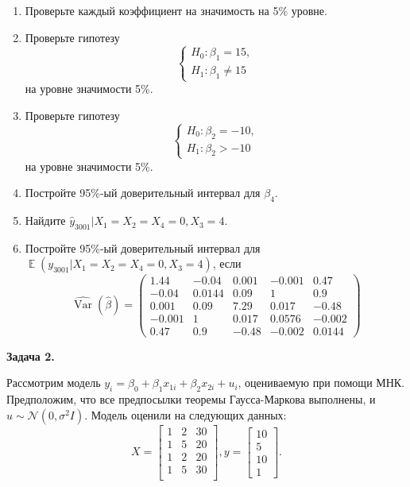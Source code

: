 \documentclass[10pt, a4paper]{extarticle}
\DeclareMathOperator{\Var}{Var}
\DeclareMathOperator{\E}{\mathbb{E}}
\begin{document}
	\begin{enumerate}[label=\alph*)]
		\item Проверьте каждый коэффициент на значимость на 5\% уровне.
		\item Проверьте гипотезу
		\[
		\begin{cases}
			H_0: \beta_1 = 15, \\
			H_1: \beta_1 \ne 15
		\end{cases}
		\]
		на уровне значимости 5\%.
		\item Проверьте гипотезу
		\[
		\begin{cases}
			H_0: \beta_2 = -10, \\
			H_1: \beta_2 > -10
		\end{cases}
		\]
		на уровне значимости 5\%.
		\item Постройте 95\%-ый доверительный интервал для $\beta_4$. 
		\item Найдите $\hat{y}_{3001} | X_1 = X_2 = X_4 = 0, X_3 = 4$. 
		\item Постройте 95\%-ый доверительный интервал для $\E(y_{3001} | X_1 = X_2 = X_4 = 0, X_3 = 4)$, если 
		\[
		\hat{\Var}(\hat{\beta}) = \begin{pmatrix}
			  1.44 & -0.04 & 0.001 & -0.001  & 0.47 \\
			-0.04  & 0.0144 & 0.09 & 1 & 0.9 \\
			0.001  & 0.09 & 7.29 & 0.017 & -0.48 \\
			-0.001 & 1 & 0.017 & 0.0576 & -0.002 \\
			0.47 & 0.9 & -0.48 & -0.002 & 0.0144
		\end{pmatrix}
		\]
	\end{enumerate}
	\vspace{1em}
	\newpage

	{\Large \textbf{Задача 2.}}
	
	Рассмотрим модель $y_i = \beta_0 + \beta_1x_{1i} + \beta_2x_{2i} + u_i$, оцениваемую при помощи МНК. Предположим, что все предпосылки теоремы Гаусса-Маркова выполнены, и $u \sim \mathcal{N}(0, \sigma^2I)$. Модель оценили на следующих данных:
	\[
	X = \begin{bmatrix}
		1 & 2 & 30 \\
		1 & 5 & 20 \\
		1 & 2 & 20 \\
		1 & 5 & 30 \\
	\end{bmatrix},
	y = \begin{bmatrix}
		10 \\
		5 \\
		10 \\
		1
	\end{bmatrix}.
	\]
	
\end{document}
